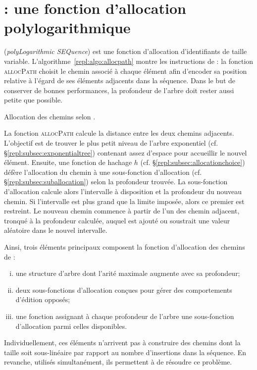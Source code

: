 
\section{\LSEQ : une fonction d'allocation polylogarithmique}
\label{repl:sec:proposal}

\LSEQ (\emph{polyLogarithmic SEQuence}) est une fonction d'allocation
d'identifiants de taille variable. L'algorithme~\ref{repl:algo:allocpath} montre
les instructions de \LSEQ : la fonction \textsc{allocPath} choisit le chemin
associé à chaque élément afin d'encoder sa position relative à l'égard de ses
éléments adjacents dans la séquence. Dans le but de conserver de bonnes
performances, la profondeur de l'arbre doit rester aussi petite que possible.

\begin{algorithm}
  
  \caption[Allocation des chemins selon \LSEQ]
  {\label{repl:algo:allocpath}Allocation des chemins selon \LSEQ.}
\end{algorithm}

La fonction \textsc{allocPath} calcule la distance entre les deux chemins
adjacents. L'objectif est de trouver le plus petit niveau de l'arbre exponentiel
(cf. §\ref{repl:subsec:exponentialtree}) contenant assez d'espace pour
accueillir le nouvel élément.  Ensuite, une fonction de hachage $h$
(cf. §\ref{repl:subsec:allocationchoice}) défère l'allocation du chemin à une
sous-fonction d'allocation (cf. §\ref{repl:subsec:suballocation}) selon la
profondeur trouvée.  La sous-fonction d'allocation calcule alors l'intervalle à
disposition et la profondeur du nouveau chemin. Si l'intervalle est plus grand
que la limite imposée, alors ce premier est restreint. Le nouveau chemin
commence à partir de l'un des chemin adjacent, tronqué à la profondeur calculée,
auquel est ajouté ou soustrait une valeur aléatoire dans le nouvel intervalle.


\noindent Ainsi, trois éléments principaux composent la fonction d'allocation
des chemins de \LSEQ :
\begin{enumerate}[(i)]
\item une structure d'arbre dont l'arité maximale augmente avec sa
  profondeur;
\item deux sous-fonctions d'allocation conçues pour gérer des comportements
  d'édition opposés;
\item une fonction assignant à chaque profondeur de l'arbre une sous-fonction
  d'allocation parmi celles disponibles.
\end{enumerate}
Individuellement, ces éléments n'arrivent pas à construire des chemins dont la
taille soit sous-linéaire par rapport au nombre d'insertions dans la
séquence. En revanche, utilisés simultanément, ils permettent à \LSEQ de
résoudre ce problème.

